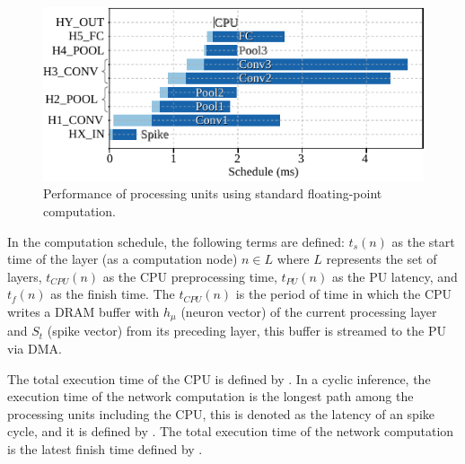 \begin{figure}[!ht]
	\centering
	\includegraphics[width=1\columnwidth]{../figures/latency_pu_fp.pdf}
	\caption{Performance of processing units using standard floating-point computation.}
	\label{fig:latency_pu_fp}
\end{figure}

In the computation schedule, the following terms are defined: $t_s(n)$ as the start time of the layer (as a computation node) $n\in L$ where $L$ represents the set of layers, $t_{CPU}(n)$ as the CPU preprocessing time, $t_{PU}(n)$ as the PU latency, and $t_f(n)$ as the finish time. The $t_{CPU}(n)$ is the period of time in which the CPU writes a DRAM buffer with $h_\mu$ (neuron vector) of the current processing layer and $S_t$ (spike vector) from its preceding layer, this buffer is streamed to the PU via DMA.

The total execution time of the CPU is defined by . In a cyclic inference, the execution time of the network computation is the longest path among the processing units including the CPU, this is denoted as the latency of an spike cycle, and it is defined by . The total execution time of the network computation is the latest finish time defined by .

